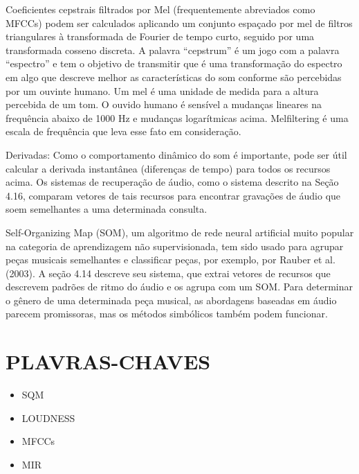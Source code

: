 \documentclass{article}
\begin{document}
Coeficientes cepstrais filtrados por Mel (frequentemente abreviados como MFCCs) podem ser calculados aplicando um conjunto espaçado por mel de filtros triangulares à transformada de Fourier de tempo curto, seguido por uma transformada cosseno discreta. A palavra “cepstrum” é um jogo com a palavra “espectro” e tem o objetivo de transmitir que é uma transformação do espectro em algo que descreve melhor as características do som conforme são percebidas por um ouvinte humano. Um mel é uma unidade de medida para a altura percebida de um tom. O ouvido humano é sensível a mudanças lineares na frequência abaixo de 1000 Hz e mudanças logarítmicas acima. Melfiltering é uma escala de frequência que leva esse fato em consideração.

Derivadas: Como o comportamento dinâmico do som é importante, pode ser útil calcular a derivada instantânea (diferenças de tempo) para todos os recursos acima. Os sistemas de recuperação de áudio, como o sistema descrito na Seção 4.16, comparam vetores de tais recursos para encontrar gravações de áudio que soem semelhantes a uma determinada consulta.

Self-Organizing Map (SOM), um algoritmo de rede neural artificial muito popular na categoria de aprendizagem não supervisionada, tem sido usado para agrupar peças musicais semelhantes e classificar peças, por exemplo, por Rauber et al. (2003). A seção 4.14 descreve seu sistema, que extrai vetores de recursos que descrevem padrões de ritmo do áudio e os agrupa com um SOM. Para determinar o gênero de uma determinada peça musical, as abordagens baseadas em áudio parecem promissoras, mas os métodos simbólicos também podem funcionar.

\section{PLAVRAS-CHAVES}
\begin{itemize}
    \item SQM
    \item LOUDNESS
    \item MFCCs
    \item MIR
\end{itemize}
\end{document}
